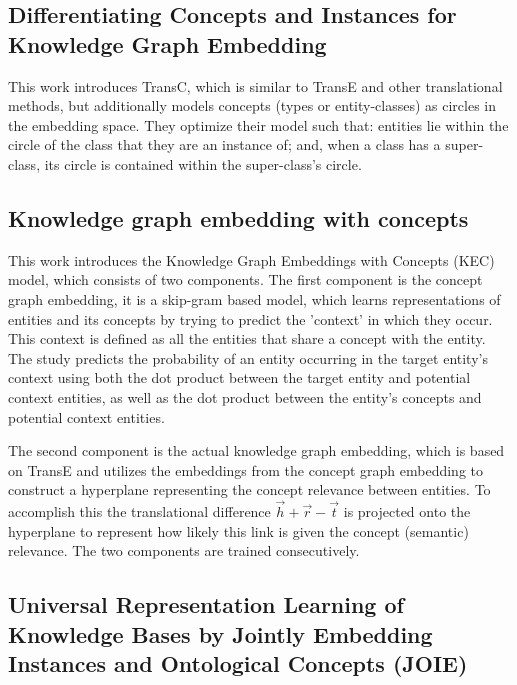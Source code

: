 \subsection{Differentiating Concepts and Instances for Knowledge Graph Embedding \texorpdfstring{\citep{lv_differentiating_2018}}{}}
This work introduces TransC, which is similar to TransE and other translational methods, but additionally models concepts (types or entity-classes) as circles in the embedding space. 
They optimize their model such that: 
entities lie within the circle of the class that they are an instance of; and,
when a class has a super-class, its circle is contained within the super-class's circle.


\subsection{Knowledge graph embedding with concepts \texorpdfstring{\citep{guan_knowledge_2019}}{}}
This work introduces the Knowledge Graph Embeddings with Concepts (KEC) model, which consists of two components. The first component is the concept graph embedding, it is a skip-gram based model, which learns representations of entities and its concepts by trying to predict the 'context' in which they occur. 
This context is defined as all the entities that share a concept with the entity.
The study predicts the probability of an entity occurring in the target entity's context using both the dot product between the target entity and potential context entities, as well as the dot product between the entity's concepts and potential context entities.

The second component is the actual knowledge graph embedding, which is based on TransE and utilizes the embeddings from the concept graph embedding to construct a hyperplane representing the concept relevance between entities. 
To accomplish this the translational difference $\vec{h}+\vec{r}-\vec{t}$ is projected onto the hyperplane to represent how likely this link is given the concept (semantic) relevance.
The two components are trained consecutively.

\subsection{Universal Representation Learning of Knowledge Bases by Jointly Embedding Instances and Ontological Concepts (JOIE) \texorpdfstring{\citep{hao2019joie}}{}}
\label{sec:hao2019joie}

